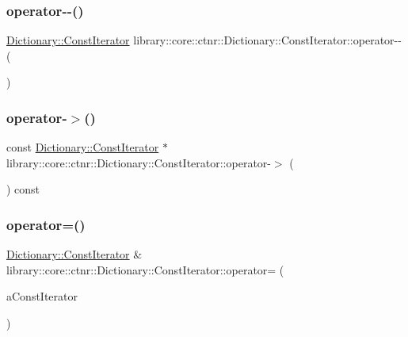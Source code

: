 \subsubsection{\texorpdfstring{operator-\/-\/()}{operator--()}\hspace{0.1cm}{\footnotesize\ttfamily [2/2]}}
{\footnotesize\ttfamily \hyperlink{classlibrary_1_1core_1_1ctnr_1_1_dictionary_1_1_const_iterator}{Dictionary\+::\+Const\+Iterator} library\+::core\+::ctnr\+::\+Dictionary\+::\+Const\+Iterator\+::operator-\/-\/ (\begin{DoxyParamCaption}\item[{int}]{ }\end{DoxyParamCaption})}

\mbox{\label{classlibrary_1_1core_1_1ctnr_1_1_dictionary_1_1_const_iterator_aa15ff64d0ce11b7eb455bd6e4ee78d73}} 
\subsubsection{\texorpdfstring{operator-\/$>$()}{operator->()}}
{\footnotesize\ttfamily const \hyperlink{classlibrary_1_1core_1_1ctnr_1_1_dictionary_1_1_const_iterator}{Dictionary\+::\+Const\+Iterator} $\ast$ library\+::core\+::ctnr\+::\+Dictionary\+::\+Const\+Iterator\+::operator-\/$>$ (\begin{DoxyParamCaption}{ }\end{DoxyParamCaption}) const}

\mbox{\label{classlibrary_1_1core_1_1ctnr_1_1_dictionary_1_1_const_iterator_afc0dcfbeef9b4e11a89bc876922551ce}} 
\subsubsection{\texorpdfstring{operator=()}{operator=()}}
{\footnotesize\ttfamily \hyperlink{classlibrary_1_1core_1_1ctnr_1_1_dictionary_1_1_const_iterator}{Dictionary\+::\+Const\+Iterator} \& library\+::core\+::ctnr\+::\+Dictionary\+::\+Const\+Iterator\+::operator= (\begin{DoxyParamCaption}\item[{const \hyperlink{classlibrary_1_1core_1_1ctnr_1_1_dictionary_1_1_const_iterator}{Const\+Iterator} \&}]{a\+Const\+Iterator }\end{DoxyParamCaption})}

